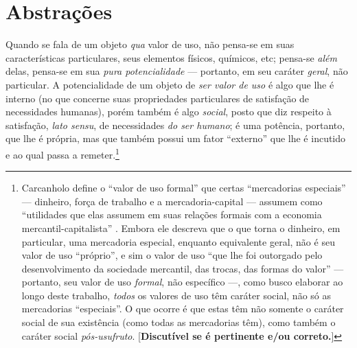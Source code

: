 \documentclass[12pt]{article}
\begin{document}
\section{Abstrações}
Quando se fala de um objeto \textit{qua} valor de uso,
não pensa-se em suas características particulares, seus elementos físicos, químicos, etc; pensa-se \textit{além} delas, pensa-se em sua \textit{pura potencialidade} --- portanto, em seu caráter \textit{geral}, não particular. A potencialidade de um objeto de \textit{ser valor de uso} é algo que lhe é interno (no que concerne suas propriedades particulares de satisfação de necessidades humanas), porém também é algo \textit{social}, posto que diz respeito à satisfação, \textit{lato sensu}, de necessidades \textit{do ser humano}; é uma potência, portanto, que lhe é própria, mas que também possui um fator ``externo'' que lhe é incutido e ao qual passa a remeter.\footnote{Carcanholo define o ``valor de uso formal'' que certas ``mercadorias especiais'' --- dinheiro, força de trabalho e a mercadoria-capital --- assumem como ``utilidades que elas assumem em suas relações formais com a economia mercantil-capitalista'' \cite[p. 32-3]{Carcanholo1998}. Embora ele descreva que o que torna o dinheiro, em particular, uma mercadoria especial, enquanto equivalente geral, não é seu valor de uso ``próprio'', e sim o valor de uso ``que lhe foi outorgado pelo desenvolvimento da sociedade mercantil, das trocas, das formas do valor'' \cite[p. 34]{Carcanholo1998} --- portanto, seu valor de uso \textit{formal}, não específico ---, como busco elaborar ao longo deste trabalho, \textit{todos} os valores de uso têm caráter social, não só as mercadorias ``especiais''. O que ocorre é que estas têm não somente o caráter social de sua existência (como todas as mercadorias têm), como também o caráter social \textit{pós-usufruto}. [\textbf{Discutível se é pertinente e/ou correto.}]}
\end{document}
